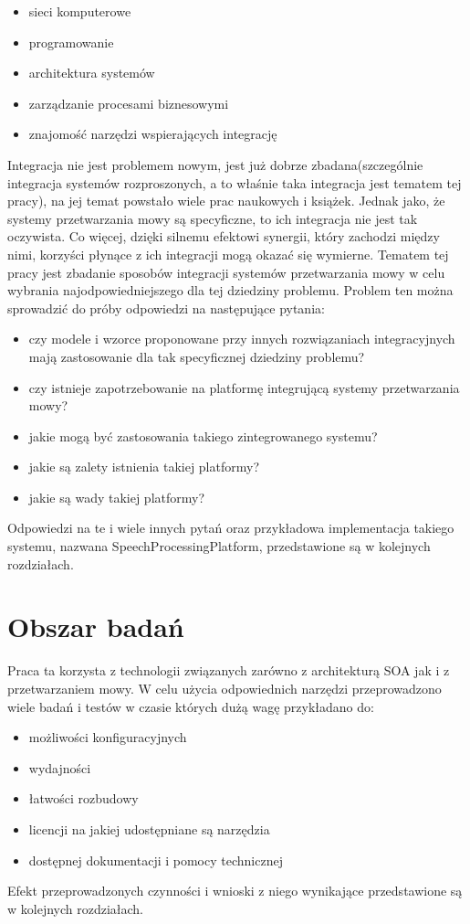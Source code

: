  \begin{itemize}
	\item sieci komputerowe
	\item programowanie
	\item architektura systemów
	\item zarządzanie procesami biznesowymi
	\item znajomość narzędzi wspierających integrację
\end{itemize}   
Integracja nie jest problemem nowym, jest już dobrze zbadana(szczególnie integracja systemów rozproszonych, a to właśnie taka integracja jest tematem tej pracy), na jej temat powstało wiele prac naukowych i książek. Jednak jako, że systemy przetwarzania mowy są specyficzne, to ich integracja nie jest tak oczywista. Co więcej, dzięki silnemu efektowi synergii, który zachodzi między nimi, korzyści płynące z ich integracji mogą okazać się wymierne. Tematem tej pracy jest zbadanie sposobów integracji systemów przetwarzania mowy w celu wybrania najodpowiedniejszego dla tej dziedziny problemu. Problem ten można sprowadzić do próby odpowiedzi na następujące pytania:
 \begin{itemize}
	\item  czy modele i wzorce proponowane przy innych rozwiązaniach integracyjnych mają zastosowanie dla tak specyficznej dziedziny problemu?
	\item czy istnieje zapotrzebowanie na platformę integrującą systemy przetwarzania mowy?
	\item jakie mogą być zastosowania takiego zintegrowanego systemu?
	\item jakie są zalety istnienia takiej platformy?
	\item jakie są wady takiej platformy?
\end{itemize}  
Odpowiedzi na te i wiele innych pytań oraz przykładowa implementacja takiego systemu, nazwana SpeechProcessingPlatform,  przedstawione są w kolejnych rozdziałach.

\section{Obszar badań} %
Praca ta korzysta z technologii związanych zarówno z architekturą SOA jak i z przetwarzaniem mowy. W celu użycia odpowiednich narzędzi przeprowadzono wiele badań i testów w czasie których dużą wagę przykładano do:
\begin{itemize}
 	\item możliwości konfiguracyjnych
	\item wydajności
	\item łatwości rozbudowy
	\item licencji na jakiej udostępniane są narzędzia
	\item dostępnej dokumentacji i pomocy technicznej
\end{itemize}
Efekt przeprowadzonych czynności i wnioski z niego wynikające przedstawione są w kolejnych rozdziałach.


